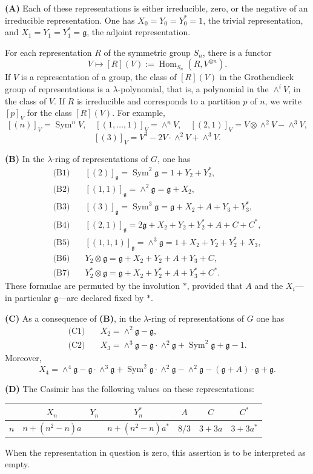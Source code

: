 \documentclass[11pt,a4paper]{article}
\DeclareMathOperator{\Sym}{Sym}
\DeclareMathOperator{\Hom}{Hom}
\newcommand{\frg}{\mathfrak{g}}
\begin{document}
\medskip
\noindent\textbf{(A)} Each of these representations is either irreducible, zero, or the negative of an irreducible representation. One has $X_0=Y_0=Y_0^*=1$, the trivial representation, and $X_1=Y_1=Y_1^*=\frg$, the adjoint representation.

\medskip
For each representation $R$ of the symmetric group $S_n$, there is a functor
\[
V\longmapsto [R](V):=\Hom_{S_n}(R,V^{\otimes n}).
\]
If $V$ is a representation of a group, the class of $[R](V)$ in the Grothendieck group of representations is a $\lambda$-polynomial, that is, a polynomial in the $\wedge^iV$, in the class of $V$. If $R$ is irreducible and corresponds to a partition $p$ of $n$, we write $[p]_V$ for the class $[R](V)$. For example,
\[
[(n)]_V=\Sym^n V,\quad [(1,\ldots,1)]_V=\wedge^n V,\quad [(2,1)]_V=V\otimes\wedge^2V-\wedge^3V,
\]
\[
[(3)]_V=V^3-2V\cdot\wedge^2V+\wedge^3V.
\]

\medskip
\noindent\textbf{(B)} In the $\lambda$-ring of representations of $G$, one has
\begin{align*}
\text{(B1)}\quad &[(2)]_{\frg}=\Sym^2\frg=1+Y_2+Y_2^*,\\
\text{(B2)}\quad &[(1,1)]_{\frg}=\wedge^2\frg=\frg+X_2,\\
\text{(B3)}\quad &[(3)]_{\frg}=\Sym^3\frg=\frg+X_2+A+Y_3+Y_3^*,\\
\text{(B4)}\quad &[(2,1)]_{\frg}=2\frg+X_2+Y_2+Y_2^*+A+C+C^*,\\
\text{(B5)}\quad &[(1,1,1)]_{\frg}=\wedge^3\frg=1+X_2+Y_2+Y_2^*+X_3,\\
\text{(B6)}\quad &Y_2\otimes\frg=\frg+X_2+Y_2+A+Y_3+C,\\
\text{(B7)}\quad &Y_2^*\otimes\frg=\frg+X_2+Y_2^*+A+Y_3^*+C^*.
\end{align*}
These formulae are permuted by the involution $*$, provided that $A$ and the $X_i$---in particular $\frg$---are declared fixed by $*$.

\medskip
\noindent\textbf{(C)} As a consequence of \textbf{(B)}, in the $\lambda$-ring of representations of $G$ one has
\begin{align*}
\text{(C1)}\quad &X_2=\wedge^2\frg-\frg,\\
\text{(C2)}\quad &X_3=\wedge^3\frg-\frg\cdot\wedge^2\frg+\Sym^2\frg+\frg-1.
\end{align*}
Moreover,
\[
X_4=\wedge^4\frg-\frg\cdot\wedge^3\frg+\Sym^2\frg\cdot\wedge^2\frg-\wedge^2\frg-(\frg+A)\cdot\frg+\frg.
\]

\medskip
\noindent\textbf{(D)} The Casimir has the following values on these representations:
\begin{center}
\begin{tabular}{c|cccccc}
 & $X_n$ & $Y_n$ & $Y_n^*$ & $A$ & $C$ & $C^*$ \\
\hline
$n$ & $n+(n^2-n)a$ & & $n+(n^2-n)a^*$ & $8/3$ & $3+3a$ & $3+3a^*$
\end{tabular}
\end{center}
When the representation in question is zero, this assertion is to be interpreted as empty.
\end{document}
